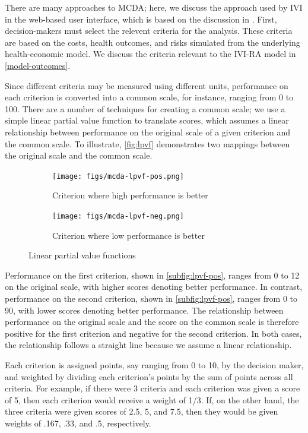 \documentclass[11pt,final,fleqn]{article}
\theoremstyle{plain}
\begin{document}
There are many approaches to MCDA; here, we discuss the approach used by IVI in the web-based user interface, which is based on the discussion in \citet{thokala2016multiple}. First, decision-makers must select the relevent criteria for the analysis. These criteria are based on the costs, health outcomes, and risks simulated from the underlying health-economic model. We discuss the criteria relevant to the IVI-RA model in \autoref{model-outcomes}.

Since different criteria may be measured using different units, performance on each criterion is converted into a common scale, for instance, ranging from 0 to 100. There are a number of techniques for creating a common scale; we use a simple linear partial value function to translate scores, which assumes a linear relationship between performance on the original scale of a given criterion and the common scale. To illustrate, \autoref{fig:lpvf} demonstrates two mappings between the original scale and the common scale.


\begin{figure}[h]
\begin{subfigure}{.5\textwidth}
\texttt{[image: figs/mcda-lpvf-pos.png]}
\caption{Criterion where high performance is better} \label{subfig:lpvf-pos}
\end{subfigure}
\begin{subfigure}{.5\textwidth}
\texttt{[image: figs/mcda-lpvf-neg.png]}
\caption{Criterion where low performance is better} \label{subfig:lpvf-neg}
\end{subfigure}
\caption{Linear partial value functions}\label{fig:lpvf}
\end{figure}

Performance on the first criterion, shown in \autoref{subfig:lpvf-pos}, ranges from 0 to 12 on the original scale, with higher scores denoting better performance. In contrast, performance on the second criterion, shown in \autoref{subfig:lpvf-pos}, ranges from 0 to 90, with lower scores denoting better performance. The relationship between performance on the original scale and the score on the common scale is therefore positive for the first criterion and negative for the second criterion. In both cases, the relationship follows a straight line because we assume a linear relationship.

Each criterion is assigned points, say ranging from 0 to 10, by the decision maker, and weighted by dividing each criterion's points by the sum of points across all criteria. For example, if there were 3 criteria and each criterion was given a score of 5, then each criterion would receive a weight of 1/3. If, on the other hand, the three criteria were given scores of 2.5, 5, and 7.5, then they would be given weights of .167, .33, and .5, respectively. 
\end{document}
